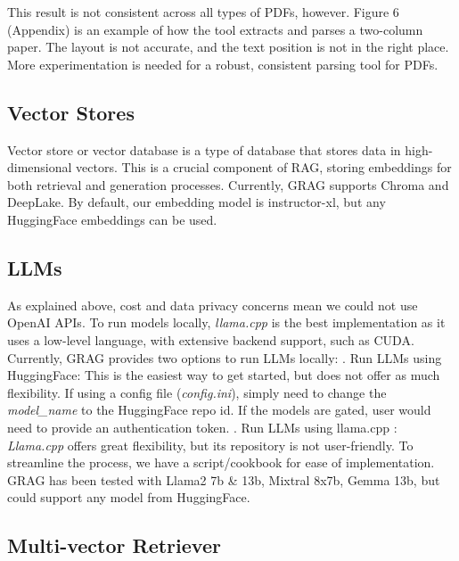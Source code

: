 \documentclass{scrartcl}
\begin{document}
This result is not consistent across all types of PDFs, however. Figure 6 (Appendix) is an example of how the tool extracts and parses a two-column paper. The layout is not accurate, and the text position is not in the right place. More experimentation is needed for a robust, consistent parsing tool for PDFs.


\subsection{Vector Stores}

Vector store or vector database is a type of database that stores data in high-dimensional vectors. This is a crucial component of RAG, storing embeddings for both retrieval and generation processes.
Currently, GRAG supports Chroma\cite{chroma} and DeepLake\cite{deeplake}. By default, our embedding model is instructor-xl, but any HuggingFace embeddings can be used.

\subsection{LLMs}
As explained above, cost and data privacy concerns mean we could not use OpenAI APIs. To run models locally, \textit{llama.cpp} is the best implementation as it uses a low-level language, with extensive backend support, such as CUDA.
Currently, GRAG provides two options to run LLMs locally:
\newline
{}. Run LLMs using HuggingFace\cite{huggingface}:
\newline
This is the easiest way to get started, but does not offer as much flexibility. If using a config file (\textit{config.ini}), simply need to change the \textit{model\_name} to the HuggingFace repo id.
If the models are gated, user would need to provide an authentication token.
\newline
{}. Run LLMs using llama.cpp \cite{langchain2023llamacpp}:
\newline
\textit{Llama.cpp} offers great flexibility, but its repository is not user-friendly. To streamline the process, we have a script/cookbook for ease of implementation.
\newline
\newline
GRAG has been tested with Llama2 7b \& 13b, Mixtral 8x7b, Gemma 13b, but could support any model from HuggingFace.
\newpage
\subsection{Multi-vector Retriever}
\end{document}
